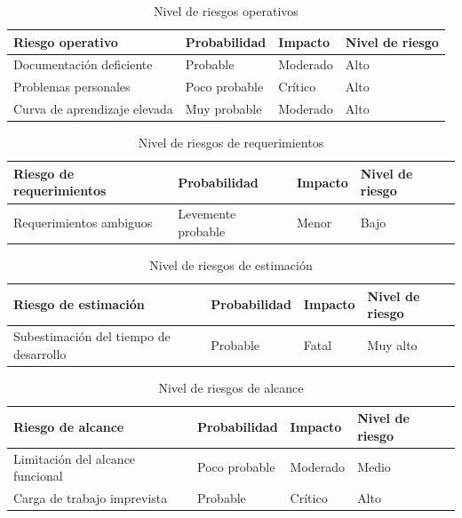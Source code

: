 \begin{table}[H]
	\centering
	\renewcommand{\arraystretch}{1.2}
	\setlength{\tabcolsep}{4pt}
	\begin{tabular}{|p{}|p{}|p{}|p{}|}
		\hline
		\textbf{Riesgo operativo} & \textbf{Probabilidad} & \textbf{Impacto} & \textbf{Nivel de riesgo} \\ \hline
		Documentación deficiente & Probable & Moderado & Alto \\ \hline
		Problemas personales & Poco probable & Crítico & Alto \\ \hline
		Curva de aprendizaje elevada & Muy probable & Moderado & Alto \\ \hline
	\end{tabular}
	\caption{Nivel de riesgos operativos}
	\label{table:riesgos_operativos}
\end{table}

\begin{table}[H]
	\centering
	\renewcommand{\arraystretch}{1.2}
	\setlength{\tabcolsep}{4pt}
	\begin{tabular}{|p{}|p{}|p{}|p{}|}
		\hline
		\textbf{Riesgo de requerimientos} & \textbf{Probabilidad} & \textbf{Impacto} & \textbf{Nivel de riesgo} \\ \hline
		Requerimientos ambiguos & Levemente probable & Menor & Bajo \\ \hline
	\end{tabular}
	\caption{Nivel de riesgos de requerimientos}
	\label{table:riesgos_requerimientos}
\end{table}

\begin{table}[H]
	\centering
	\renewcommand{\arraystretch}{1.2}
	\setlength{\tabcolsep}{4pt}
	\begin{tabular}{|p{}|p{}|p{}|p{}|}
		\hline
		\textbf{Riesgo de estimación} & \textbf{Probabilidad} & \textbf{Impacto} & \textbf{Nivel de riesgo} \\ \hline
		 Subestimación del tiempo de desarrollo & Probable & Fatal & Muy alto \\ \hline
	\end{tabular}
	\caption{Nivel de riesgos de estimación}
	\label{table:riesgos_estimacion}
\end{table}

\begin{table}[H]
	\centering
	\renewcommand{\arraystretch}{1.2}
	\setlength{\tabcolsep}{4pt}
	\begin{tabular}{|p{}|p{}|p{}|p{}|}
		\hline
		\textbf{Riesgo de alcance} & \textbf{Probabilidad} & \textbf{Impacto} & \textbf{Nivel de riesgo} \\ \hline 
		 Limitación del alcance funcional & Poco probable & Moderado & Medio \\ \hline
		 Carga de trabajo imprevista & Probable & Crítico & Alto \\ \hline
	\end{tabular}
	\caption{Nivel de riesgos de alcance}
	\label{table:riesgos_alcance}
\end{table}

